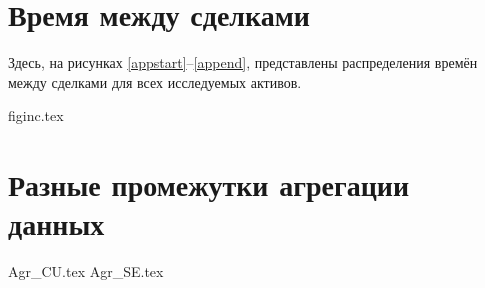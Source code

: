 \begin{appendices}
	

        \section{Время между сделками} \label{timedistr}
        Здесь, на рисунках \ref{appstart}--\ref{append}, представлены распределения времён между сделками для всех исследуемых активов.

        {figinc.tex}

        \section{Разные промежутки агрегации данных} \label{aggrnot1}

        {Agr_CU.tex}
        {Agr_SE.tex}




\end{appendices}   %